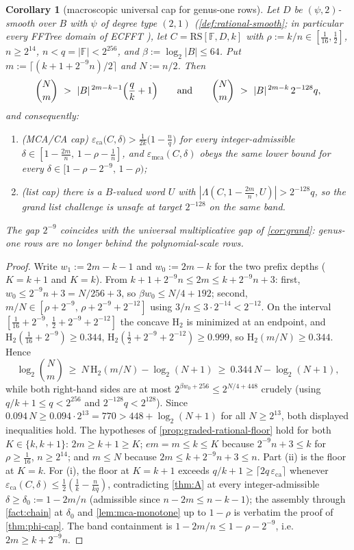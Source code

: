 \documentclass[11pt]{article}
\newtheorem{corollary}[corollary]{Corollary}
\theoremstyle{definition}
\theoremstyle{remark}
\newcommand{\F}{\mathbb{F}}
\newcommand{\B}{B}
\newcommand{\RS}{\mathrm{RS}}
\newcommand{\eca}{\varepsilon_{\mathrm{ca}}}
\newcommand{\emca}{\varepsilon_{\mathrm{mca}}}
\newcommand{\Lst}{\Lambda}
\newcommand{\Hb}{\mathrm{H}_2}
\begin{document}
\begin{corollary}[macroscopic universal cap for genus-one rows]\label{cor:ecfft-macroscopic}
Let $D$ be $(\psi,2)$-smooth over $\B$ with $\psi$ of degree type $(2,1)$ \textup(\cref{def:rational-smooth}; in particular every FFTree domain of ECFFT \cite{BCKL21}\textup), let $C=\RS[\F,D,k]$ with $\rho:=k/n\in[\tfrac1{16},\tfrac12]$, $n\ge2^{14}$, $n<q=|\F|<2^{256}$, and $\beta:=\log_2|\B|\le64$. Put $m:=\lceil(k+1+2^{-9}n)/2\rceil$ and $N:=n/2$. Then
\[
\binom Nm\ >\ |\B|^{\,2m-k-1}\Bigl(\frac qk+1\Bigr)
\qquad\text{and}\qquad
\binom Nm\ >\ |\B|^{\,2m-k}\,2^{-128}q ,
\]
and consequently:
\begin{enumerate}[label=\textup{(\roman*)}]
\item \textup(MCA/CA cap\textup) $\eca\bigl(C,\delta\bigr)>\frac1{2k}\bigl(1-\frac nq\bigr)$ for every integer-admissible $\delta\in[1-\frac{2m}n,\,1-\rho-\frac1n]$, and $\emca(C,\delta)$ obeys the same lower bound for every $\delta\in[1-\rho-2^{-9},\,1-\rho)$;
\item \textup(list cap\textup) there is a $\B$-valued word $U$ with $|\Lst(C,1-\frac{2m}n,U)|>2^{-128}q$, so the grand list challenge is unsafe at target $2^{-128}$ on the same band.
\end{enumerate}
The gap $2^{-9}$ coincides with the universal multiplicative gap of \cref{cor:grand}: genus-one rows are no longer behind the polynomial-scale rows.
\end{corollary}

\begin{proof}
Write $w_1:=2m-k-1$ and $w_0:=2m-k$ for the two prefix depths ($K=k+1$ and $K=k$). From $k+1+2^{-9}n\le2m\le k+2^{-9}n+3$: first, $w_0\le2^{-9}n+3=N/256+3$, so $\beta w_0\le N/4+192$; second, $m/N\in[\rho+2^{-9},\,\rho+2^{-9}+2^{-12}]$ using $3/n\le3\cdot2^{-14}<2^{-12}$. On the interval $[\tfrac1{16}+2^{-9},\,\tfrac12+2^{-9}+2^{-12}]$ the concave $\Hb$ is minimized at an endpoint, and $\Hb(\tfrac1{16}+2^{-9})\ge0.344$, $\Hb(\tfrac12+2^{-9}+2^{-12})\ge0.999$, so $\Hb(m/N)\ge0.344$. Hence
\[
\log_2\binom Nm\ \ge\ N\,\Hb(m/N)-\log_2(N+1)\ \ge\ 0.344\,N-\log_2(N+1),
\]
while both right-hand sides are at most $2^{\beta w_0+256}\le2^{N/4+448}$ crudely \textup(using $q/k+1\le q<2^{256}$ and $2^{-128}q<2^{128}$\textup). Since $0.094\,N\ge0.094\cdot2^{13}=770>448+\log_2(N+1)$ for all $N\ge2^{13}$, both displayed inequalities hold. The hypotheses of \cref{prop:graded-rational-floor} hold for both $K\in\{k,k+1\}$: $2m\ge k+1\ge K$; $em=m\le k\le K$ because $2^{-9}n+3\le k$ for $\rho\ge\tfrac1{16}$, $n\ge2^{14}$; and $m\le N$ because $2m\le k+2^{-9}n+3\le n$. Part \textup{(ii)} is the floor at $K=k$. For \textup{(i)}, the floor at $K=k+1$ exceeds $q/k+1\ge\lceil2q\,\eca\rceil$ whenever $\eca(C,\delta)\le\frac12(\frac1k-\frac n{kq})$, contradicting \cref{thm:A} at every integer-admissible $\delta\ge\delta_0:=1-2m/n$ \textup(admissible since $n-2m\le n-k-1$\textup); the assembly through \cref{fact:chain} at $\delta_0$ and \cref{lem:mca-monotone} up to $1-\rho$ is verbatim the proof of \cref{thm:phi-cap}. The band containment is $1-2m/n\le1-\rho-2^{-9}$, i.e.\ $2m\ge k+2^{-9}n$.
\end{proof}
\end{document}
